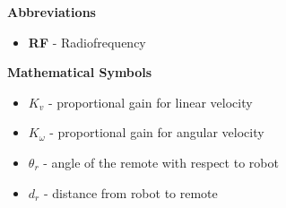 
\renewcommand{\nomname}{Nomenclature}
\renewcommand{\nomAname}{\textbf{\large Abbreviations}}
\renewcommand{\nomGname}{\textbf{\large Mathematical Symbols}}
\renewcommand{\nomXname}{\textbf{\large Superscripts}}
\renewcommand{\nomZname}{\textbf{\large Subscripts}}

\printnomenclature
\cleardoublepage
{} %


\nomAname
\begin{itemize}
    \item[]\textbf{RF} - Radiofrequency
\end{itemize}
\bigbreak

\nomGname
\begin{itemize}
    \item[]$K_v$ - proportional gain for linear velocity
    \item[]$K_\omega$ - proportional gain for angular velocity
    \item[]$\theta_r$ - angle of the remote with respect to robot
    \item[]$d_r$ - distance from robot to remote
\end{itemize}


